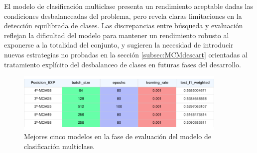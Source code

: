 El modelo de clasificación multiclase presenta un rendimiento aceptable dadas las condiciones desbalanceadas del problema, pero revela claras limitaciones en la detección equilibrada de clases. Las discrepancias entre búsqueda y evaluación reflejan la dificultad del modelo para mantener un rendimiento robusto al exponerse a la totalidad del conjunto, y sugieren la necesidad de introducir nuevas estrategias no probadas en la sección \ref{subsec:MCMdescart}  orientadas al tratamiento explícito del desbalanceo de clases en futuras fases del desarrollo.

\begin{figure}[H]
    \centering
    \includegraphics[width=0.9\textwidth]{./img/evaluacion/resultados/top5EVALMCM.pdf}
    \caption{Mejores cinco modelos en la fase de evaluación del modelo de clasificación multiclase.}
    \label{fig:top5EVALMCM}
\end{figure}


